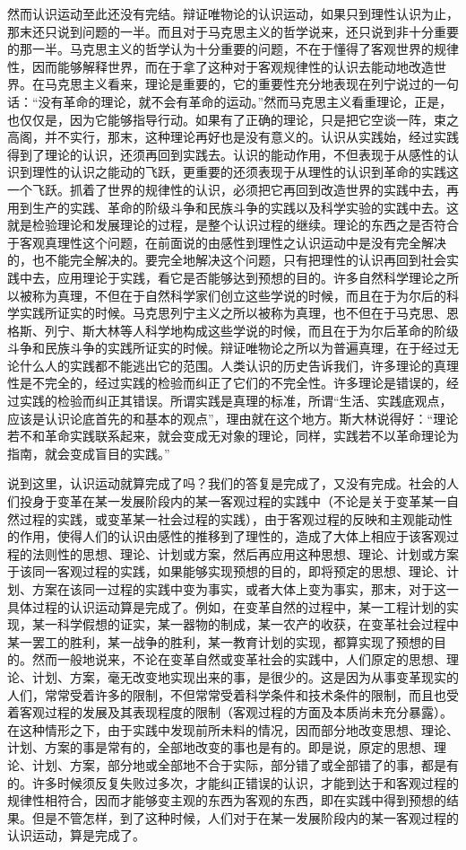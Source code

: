 然而认识运动至此还没有完结。辩证唯物论的认识运动，如果只到理性认识为止，那末还只说到问题的一半。而且对于马克思主义的哲学说来，还只说到非十分重要的那一半。马克思主义的哲学认为十分重要的问题，不在于懂得了客观世界的规律性，因而能够解释世界，而在于拿了这种对于客观规律性的认识去能动地改造世界。在马克思主义看来，理论是重要的，它的重要性充分地表现在列宁说过的一句话：“没有革命的理论，就不会有革命的运动。”然而马克思主义看重理论，正是，也仅仅是，因为它能够指导行动。如果有了正确的理论，只是把它空谈一阵，束之高阁，并不实行，那末，这种理论再好也是没有意义的。认识从实践始，经过实践得到了理论的认识，还须再回到实践去。认识的能动作用，不但表现于从感性的认识到理性的认识之能动的飞跃，更重要的还须表现于从理性的认识到革命的实践这一个飞跃。抓着了世界的规律性的认识，必须把它再回到改造世界的实践中去，再用到生产的实践、革命的阶级斗争和民族斗争的实践以及科学实验的实践中去。这就是检验理论和发展理论的过程，是整个认识过程的继续。理论的东西之是否符合于客观真理性这个问题，在前面说的由感性到理性之认识运动中是没有完全解决的，也不能完全解决的。要完全地解决这个问题，只有把理性的认识再回到社会实践中去，应用理论于实践，看它是否能够达到预想的目的。许多自然科学理论之所以被称为真理，不但在于自然科学家们创立这些学说的时候，而且在于为尔后的科学实践所证实的时候。马克思列宁主义之所以被称为真理，也不但在于马克思、恩格斯、列宁、斯大林等人科学地构成这些学说的时候，而且在于为尔后革命的阶级斗争和民族斗争的实践所证实的时候。辩证唯物论之所以为普遍真理，在于经过无论什么人的实践都不能逃出它的范围。人类认识的历史告诉我们，许多理论的真理性是不完全的，经过实践的检验而纠正了它们的不完全性。许多理论是错误的，经过实践的检验而纠正其错误。所谓实践是真理的标准，所谓“生活、实践底观点，应该是认识论底首先的和基本的观点”，理由就在这个地方。斯大林说得好：“理论若不和革命实践联系起来，就会变成无对象的理论，同样，实践若不以革命理论为指南，就会变成盲目的实践。”

说到这里，认识运动就算完成了吗？我们的答复是完成了，又没有完成。社会的人们投身于变革在某一发展阶段内的某一客观过程的实践中（不论是关于变革某一自然过程的实践，或变革某一社会过程的实践），由于客观过程的反映和主观能动性的作用，使得人们的认识由感性的推移到了理性的，造成了大体上相应于该客观过程的法则性的思想、理论、计划或方案，然后再应用这种思想、理论、计划或方案于该同一客观过程的实践，如果能够实现预想的目的，即将预定的思想、理论、计划、方案在该同一过程的实践中变为事实，或者大体上变为事实，那末，对于这一具体过程的认识运动算是完成了。例如，在变革自然的过程中，某一工程计划的实现，某一科学假想的证实，某一器物的制成，某一农产的收获，在变革社会过程中某一罢工的胜利，某一战争的胜利，某一教育计划的实现，都算实现了预想的目的。然而一般地说来，不论在变革自然或变革社会的实践中，人们原定的思想、理论、计划、方案，毫无改变地实现出来的事，是很少的。这是因为从事变革现实的人们，常常受着许多的限制，不但常常受着科学条件和技术条件的限制，而且也受着客观过程的发展及其表现程度的限制（客观过程的方面及本质尚未充分暴露）。在这种情形之下，由于实践中发现前所未料的情况，因而部分地改变思想、理论、计划、方案的事是常有的，全部地改变的事也是有的。即是说，原定的思想、理论、计划、方案，部分地或全部地不合于实际，部分错了或全部错了的事，都是有的。许多时候须反复失败过多次，才能纠正错误的认识，才能到达于和客观过程的规律性相符合，因而才能够变主观的东西为客观的东西，即在实践中得到预想的结果。但是不管怎样，到了这种时候，人们对于在某一发展阶段内的某一客观过程的认识运动，算是完成了。

